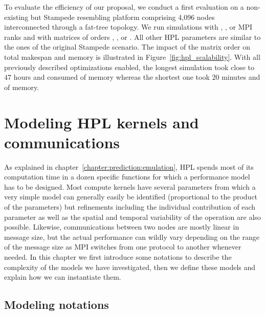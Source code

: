        To evaluate the efficiency of our proposal, we conduct a first evaluation on a non-existing but Stampede
        resembling platform comprising 4,096 nodes interconnected through a fat-tree topology.
        We run simulations with , ,  or  MPI ranks and with matrices of orders
        , ,  or . All other HPL parameters are similar to the ones of the original
        Stampede scenario.  The impact of the matrix order on total makespan and memory is illustrated in
        Figure~\ref{fig:hpl_scalability}.  With all previously described optimizations enabled, the longest simulation
        took close to \(47\) hours and consumed  of memory whereas the shortest one took \(20\)
        minutes and  of memory.

\chapter{Modeling HPL kernels and communications}%
\label{chapter:prediction:modeling}

    As explained in chapter~\ref{chapter:prediction:emulation}, HPL spends most of its computation time in a dozen specific
    functions for which a performance model has to be designed. Most compute kernels have several parameters from which
    a very simple model can generally easily be identified (\eg proportional to the product of the parameters) but
    refinements including the individual contribution of each parameter as well as the spatial and temporal variability
    of the operation are also possible. Likewise, communications between two nodes are mostly linear in message size, but
    the actual performance can wildly vary depending on the range of the message size as MPI switches from one
    protocol to another whenever needed. In this chapter we first introduce some notations to describe the complexity of
    the models we have investigated, then we define these models and explain how we can instantiate them.

    \section{Modeling notations}%

